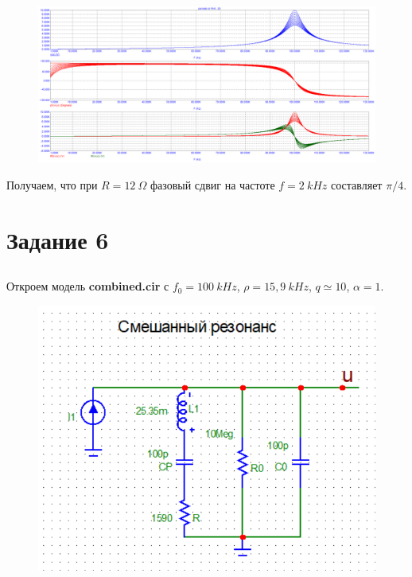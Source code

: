 \documentclass{article}
\begin{document}
\begin{figure}[H]
\centering
\includegraphics[scale=0.4]{parallel_AC3.png}
\label{fig:Image1}
\end{figure} 

Получаем, что при $R = 12 \: \Omega$ фазовый сдвиг на частоте $f = 2 \: kHz$ составляет $\pi / 4$. 

\section{Задание 6}

\subsection{}
Откроем модель \textbf{combined.cir} с $f_0 = 100 \: kHz$, $\rho = 15,9 \: kHz$, $q \simeq 10$, $\alpha = 1$.

\begin{figure}[H]
\centering
\includegraphics[scale=0.4]{combined_img.png}
\label{fig:Image1}
\end{figure}
\end{document}
